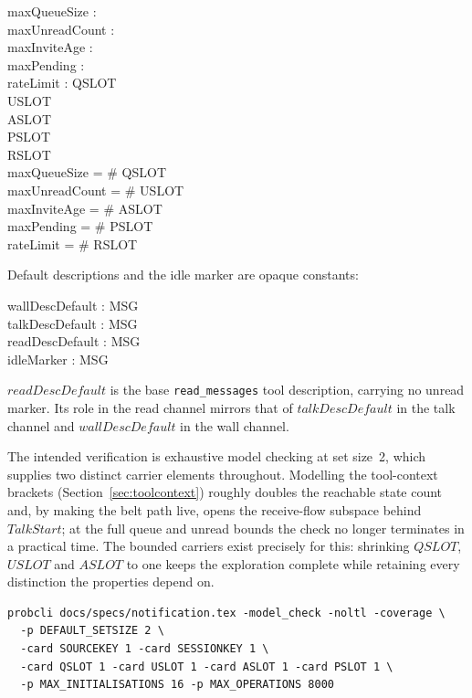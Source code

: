 \documentclass[a4paper,10pt,fleqn]{article}
\begin{document}
\begin{axdef}
  maxQueueSize : \nat \\
  maxUnreadCount : \nat \\
  maxInviteAge : \nat \\
  maxPending : \nat \\
  rateLimit : \nat
  \where
  QSLOT \neq \emptyset \\
  USLOT \neq \emptyset \\
  ASLOT \neq \emptyset \\
  PSLOT \neq \emptyset \\
  RSLOT \neq \emptyset \\
  maxQueueSize = \# QSLOT \\
  maxUnreadCount = \# USLOT \\
  maxInviteAge = \# ASLOT \\
  maxPending = \# PSLOT \\
  rateLimit = \# RSLOT
\end{axdef}

Default descriptions and the idle marker are opaque constants:

\begin{axdef}
  wallDescDefault : MSG \\
  talkDescDefault : MSG \\
  readDescDefault : MSG \\
  idleMarker : MSG
\end{axdef}

$readDescDefault$ is the base \texttt{read\_messages} tool description,
carrying no unread marker.  Its role in the read channel mirrors that of
$talkDescDefault$ in the talk channel and $wallDescDefault$ in the wall
channel.

The intended verification is exhaustive model checking at set size~2,
which supplies two distinct carrier elements throughout.  Modelling the
tool-context brackets (Section~\ref{sec:toolcontext}) roughly doubles the
reachable state count and, by making the belt path live, opens the
receive-flow subspace behind $TalkStart$; at the full queue and unread
bounds the check no longer terminates in a practical time.  The bounded
carriers exist precisely for this: shrinking $QSLOT$, $USLOT$ and $ASLOT$
to one keeps the exploration complete while retaining every distinction
the properties depend on.

\begin{verbatim}
probcli docs/specs/notification.tex -model_check -noltl -coverage \
  -p DEFAULT_SETSIZE 2 \
  -card SOURCEKEY 1 -card SESSIONKEY 1 \
  -card QSLOT 1 -card USLOT 1 -card ASLOT 1 -card PSLOT 1 \
  -p MAX_INITIALISATIONS 16 -p MAX_OPERATIONS 8000
\end{verbatim}
\end{document}
